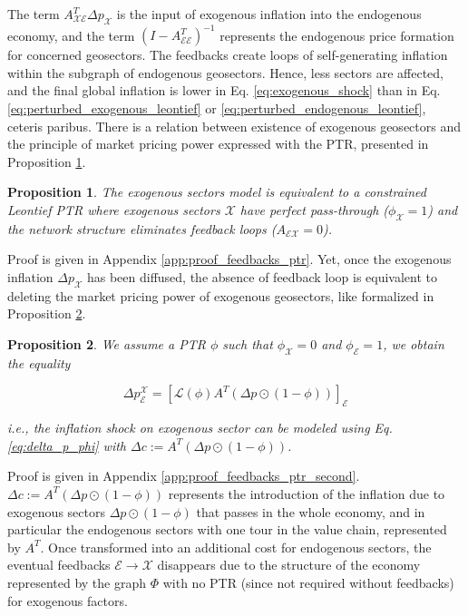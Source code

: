 \documentclass{article}
\newtheorem{proposition}{Proposition}
\begin{document}
\noindent The term $A_{\mathcal{XE}}^T \Delta p_\mathcal{X}$ is the input of exogenous inflation into the endogenous economy, and the term $\left( I - A_{\mathcal{EE}}^T \right)^{-1}$ represents the endogenous price formation for concerned geosectors. The feedbacks create loops of self-generating inflation within the subgraph of endogenous geosectors. Hence, less sectors are affected, and the final global inflation is lower in Eq. \ref{eq:exogenous_shock} than in Eq. \ref{eq:perturbed_exogenous_leontief} or \ref{eq:perturbed_endogenous_leontief}, ceteris paribus. There is a relation between existence of exogenous geosectors and the principle of market pricing power expressed with the PTR, presented in Proposition \ref{proposition:feedbacks_ptr}. 

\begin{proposition}
The exogenous sectors model is equivalent to a constrained Leontief PTR where exogenous sectors $\mathcal{X}$ have perfect pass-through ($\phi_{\mathcal{X}} = 1$) and the network structure eliminates feedback loops ($A_{\mathcal{EX}}=0$).
\label{proposition:feedbacks_ptr}
\end{proposition}

\noindent Proof is given in Appendix \ref{app:proof_feedbacks_ptr}. 
Yet, once the exogenous inflation $\Delta p_\mathcal{X}$ has been diffused, the absence of feedback loop is equivalent to deleting the market pricing power of exogenous geosectors, like formalized in Proposition \ref{proposition:feedbacks_ptr_second}. 
\begin{proposition}

 We assume a PTR $\phi$ such that $\phi_\mathcal{X}=0$ and $\phi_\mathcal{E}=1$, we obtain the equality

\[
\Delta p_\mathcal{E}^\mathcal{X} =[\mathcal{L} (\phi) A^T \left( \Delta p  \odot (1 - \phi) \right)]_\mathcal{E}
\]

\noindent i.e., the inflation shock on exogenous sector can be modeled using Eq. \ref{eq:delta_p_phi} with $\Delta c := A^T \left( \Delta p  \odot (1 - \phi) \right) $. 
\label{proposition:feedbacks_ptr_second}
\end{proposition}


\noindent Proof is given in Appendix \ref{app:proof_feedbacks_ptr_second}. $\Delta c := A^T \left( \Delta p  \odot (1 - \phi) \right)$ represents the introduction of the inflation due to exogenous sectors $\Delta p  \odot (1 - \phi)$ that passes in the whole economy, and in particular the endogenous sectors with one tour in the value chain, represented by $A^T$. Once transformed into an additional cost for endogenous sectors, the eventual feedbacks $\mathcal{E} \rightarrow \mathcal{X}$ disappears due to the structure of the economy represented by the graph $\Phi$ with no PTR (since not required without feedbacks) for exogenous factors. 
\end{document}
